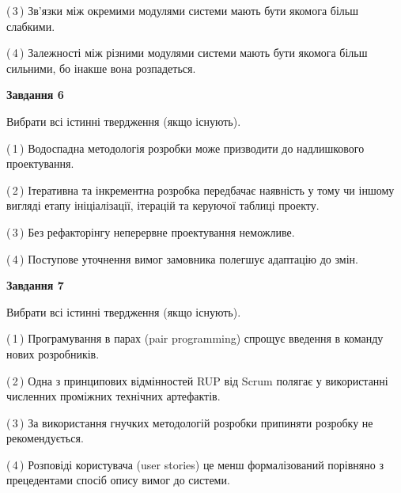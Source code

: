 \documentclass[10pt, ukrainian]{article}
\begin{document}
{\begin {large}
(\,3\,) Зв'язки між окремими модулями системи мають бути якомога більш слабкими. %



(\,4\,) Залежності між різними модулями системи мають бути якомога більш сильними, бо інакше вона розпадеться. %

\newpage

{\begin {center}\textbf{Завдання 6}\end {center}}\par
Вибрати всі істинні твердження (якщо існують).\par
\vspace{2mm}



(\,1\,) Водоспадна методологія розробки може призводити до надлишкового проектування. %



(\,2\,) Ітеративна та інкрементна розробка передбачає наявність у тому чи іншому вигляді етапу ініціалізації, ітерацій та керуючої таблиці проекту. %



(\,3\,) Без рефакторінгу неперервне проектування неможливе. %



(\,4\,) Поступове уточнення вимог замовника полегшує адаптацію до змін. %


{\begin {center}\textbf{Завдання 7}\end {center}}\par
Вибрати всі істинні твердження (якщо існують).\par
\vspace{2mm}



(\,1\,) Програмування в парах (pair programming) спрощує введення в команду нових розробників. %



(\,2\,) Одна з принципових відмінностей RUP від Scrum полягає у використанні численних проміжних технічних артефактів. %



(\,3\,) За використання гнучких методологій розробки припиняти розробку не рекомендується. %



(\,4\,) Розповіді користувача (user stories) це менш формалізований порівняно з прецедентами спосіб опису вимог до системи. %



\end{large}}
\end{document}
